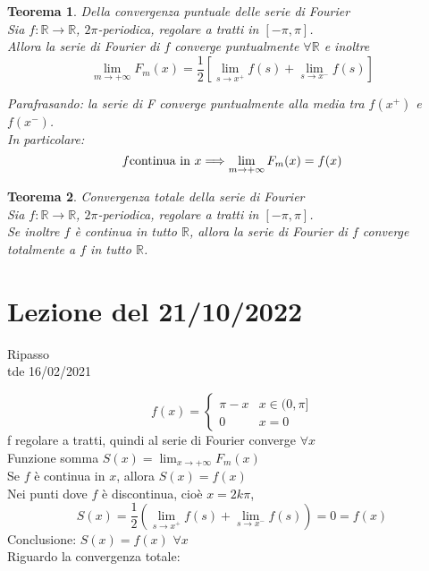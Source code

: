 \documentclass{scrreprt}
\newtheorem{teorema}{Teorema}
\newenvironment{thm}{\begin{mdframed}[backgroundcolor=Ivory2]\begin{teorema}}{\end{teorema}\end{mdframed}}
\begin{document}
\begin{thm} Della convergenza puntuale delle serie di Fourier\\
	Sia $f:\mathbb{R}\to\mathbb{R}$, $2\pi$-periodica, regolare a tratti in $[-\pi,\pi]$.\\
	Allora la serie di Fourier di $f$ converge puntualmente $\forall \mathbb{R}$ e inoltre
	\begin{equation}
		\lim_{m\to+\infty} F_m(x) = \frac{1}{2} \left[ \lim_{s\to x^+} f(s) + \lim_{s\to x^-} f(s) \right] 
	\end{equation}

Parafrasando: la serie di F converge puntualmente alla media tra $f(x^+)$ e $f(x^-)$.\\
In particolare:
\begin{equation}
	f \textnormal{continua in } x \Longrightarrow \lim_{m\to+\infty} F_m(x) = f(x)
\end{equation}
\end{thm}

\begin{thm} Convergenza totale della serie di Fourier\\
	Sia $f:\mathbb{R}\to\mathbb{R}$, $2\pi$-periodica, regolare a tratti in $[-\pi,\pi]$.\\
	Se inoltre $f$ è continua in tutto $\mathbb{R}$, allora la serie di Fourier di $f$ converge totalmente a $f$ in tutto $\mathbb{R}$.
\end{thm}



\section*{Lezione del 21/10/2022}
Ripasso\\
tde 16/02/2021

\begin{equation}
	f(x) = \begin{cases}
		\pi-x & x \in (0,\pi] \\
		0 & x = 0
	\end{cases}
\end{equation}
f regolare a tratti, quindi al serie di Fourier converge $\forall x$\\
Funzione somma $S(x) = \lim_{x\to+\infty} F_m(x)$\\
Se $f$ è continua in $x$, allora $S(x) = f(x)$\\
Nei punti dove $f$ è discontinua, cioè $x=2k\pi$,\\
\begin{equation}
	S(x)= \frac{1}{2} \left( \lim_{s\to x^+} f(s) + \lim_{s\to x^-} f(s) \right) = 0 = f(x)
\end{equation}
Conclusione: $S(x) = f(x)$ $\forall x$\\
Riguardo la convergenza totale:\\
\end{document}
